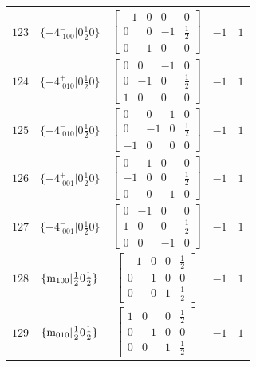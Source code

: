 \documentclass[fleqn,8pt]{jsarticle}
\begin{document}
\begin{longtable}{ccccc}
$ 123 $ & $ \{-4^{-}_{\,\,100}|0 \frac{1}{2} 0\} $ & $ \begin{bmatrix} -1 & 0 & 0 & 0 \\ 0 & 0 & -1 & \frac{1}{2} \\ 0 & 1 & 0 & 0 \end{bmatrix} $ & $ -1 $ & $ 1 $ \\ \hline
$ 124 $ & $ \{-4^{+}_{\,\,010}|0 \frac{1}{2} 0\} $ & $ \begin{bmatrix} 0 & 0 & -1 & 0 \\ 0 & -1 & 0 & \frac{1}{2} \\ 1 & 0 & 0 & 0 \end{bmatrix} $ & $ -1 $ & $ 1 $ \\ \hline
$ 125 $ & $ \{-4^{-}_{\,\,010}|0 \frac{1}{2} 0\} $ & $ \begin{bmatrix} 0 & 0 & 1 & 0 \\ 0 & -1 & 0 & \frac{1}{2} \\ -1 & 0 & 0 & 0 \end{bmatrix} $ & $ -1 $ & $ 1 $ \\ \hline
$ 126 $ & $ \{-4^{+}_{\,\,001}|0 \frac{1}{2} 0\} $ & $ \begin{bmatrix} 0 & 1 & 0 & 0 \\ -1 & 0 & 0 & \frac{1}{2} \\ 0 & 0 & -1 & 0 \end{bmatrix} $ & $ -1 $ & $ 1 $ \\ \hline
$ 127 $ & $ \{-4^{-}_{\,\,001}|0 \frac{1}{2} 0\} $ & $ \begin{bmatrix} 0 & -1 & 0 & 0 \\ 1 & 0 & 0 & \frac{1}{2} \\ 0 & 0 & -1 & 0 \end{bmatrix} $ & $ -1 $ & $ 1 $ \\ \hline
$ 128 $ & $ \{{\rm m}_{100}|\frac{1}{2} 0 \frac{1}{2}\} $ & $ \begin{bmatrix} -1 & 0 & 0 & \frac{1}{2} \\ 0 & 1 & 0 & 0 \\ 0 & 0 & 1 & \frac{1}{2} \end{bmatrix} $ & $ -1 $ & $ 1 $ \\ \hline
$ 129 $ & $ \{{\rm m}_{010}|\frac{1}{2} 0 \frac{1}{2}\} $ & $ \begin{bmatrix} 1 & 0 & 0 & \frac{1}{2} \\ 0 & -1 & 0 & 0 \\ 0 & 0 & 1 & \frac{1}{2} \end{bmatrix} $ & $ -1 $ & $ 1 $ \\ \hline

\end{longtable}
\end{document}
